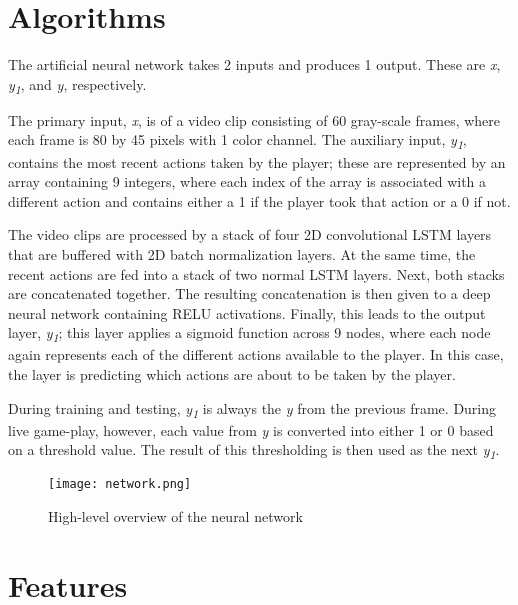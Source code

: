 


\section{Algorithms}

The artificial neural network takes 2 inputs and produces 1 output. These are \textit{x}, \textit{y\textsubscript{1}}, and \textit{y}, respectively.

The primary input, \textit{x}, is of a video clip consisting of 60 gray-scale frames, where each frame is 80 by 45 pixels with 1 color channel. The auxiliary input, \textit{y\textsubscript{1}}, contains the most recent actions taken by the player; these are represented by an array containing 9 integers, where each index of the array is associated with a different action and contains either a 1 if the player took that action or a 0 if not.

The video clips are processed by a stack of four 2D convolutional LSTM layers that are buffered with 2D batch normalization layers. At the same time, the recent actions are fed into a stack of two normal LSTM layers. Next, both stacks are concatenated together. The resulting concatenation is then given to a deep neural network containing RELU activations. Finally, this leads to the output layer, \textit{y\textsubscript{1}}; this layer applies a sigmoid function across 9 nodes, where each node again represents each of the different actions available to the player. In this case, the layer is predicting which actions are about to be taken by the player.

During training and testing, \textit{y\textsubscript{1}} is always the \textit{y} from the previous frame. During live game-play, however, each value from \textit{y} is converted into either 1 or 0 based on a threshold value. The result of this thresholding is then used as the next \textit{y\textsubscript{1}}.

\begin{figure}
    \caption{High-level overview of the neural network}
    \centering
    \texttt{[image: network.png]} \\
\end{figure}




\section{Features}

